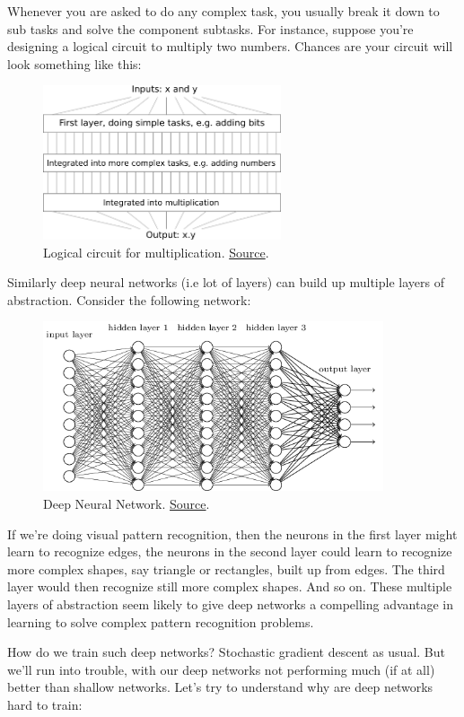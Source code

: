 \documentclass[a4paper]{tufte-handout}
\begin{document}
Whenever you are asked to do any complex task, you usually break it down
to sub tasks and solve the component subtasks. For instance, suppose
you're designing a logical circuit to multiply two numbers. Chances are
your circuit will look something like this:

\begin{figure}
\includegraphics[width=70mm]{circuit_multiplication}
\caption{Logical circuit for multiplication.
\href{http://neuralnetworksanddeeplearning.com/chap5.html\%22}{Source}.
}
\end{figure}

Similarly deep neural networks (i.e lot of layers) can build up multiple
layers of abstraction. Consider the following network:


\begin{figure}
\includegraphics[height=50mm]{tikz36}
\caption{Deep Neural Network.
\href{http://neuralnetworksanddeeplearning.com/chap5.html\%22}{Source}.}
\end{figure}


If we're doing visual pattern recognition, then the neurons in the first
layer might learn to recognize edges, the neurons in the second layer
could learn to recognize more complex shapes, say triangle or
rectangles, built up from edges. The third layer would then recognize
still more complex shapes. And so on. These multiple layers of
abstraction seem likely to give deep networks a compelling advantage in
learning to solve complex pattern recognition problems.

How do we train such deep networks? Stochastic gradient descent as
usual. But we'll run into trouble, with our deep networks not performing
much (if at all) better than shallow networks.
Let's try to understand why are deep networks hard to train:
\end{document}
